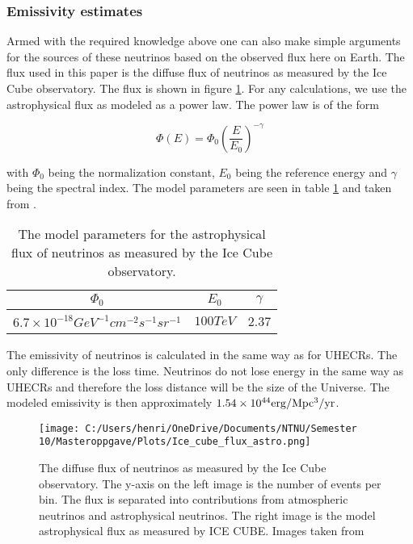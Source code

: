 \subsubsection{Emissivity estimates}
\label{sec:emmisivity_neutrinos}

Armed with the required knowledge above one can also make simple arguments for the sources of these neutrinos based on the observed 
flux here on Earth. The flux used in this paper is the diffuse flux of neutrinos as measured by the Ice Cube observatory. The flux is shown in figure \ref{fig:flux_neutrinos}. 
For any calculations, we use the astrophysical flux as modeled as a power law. The power law is of the form 

\begin{equation}
    \Phi(E) = \Phi_0 \left(\frac{E}{E_0}\right)^{-\gamma}
\end{equation}

with $\Phi_0$ being the normalization constant, $E_0$ being the reference energy and $\gamma$ being the spectral index. The model parameters are seen in table \ref{tab:neutrino_flux} and taken from \cite{Abbasi_2022}.

\begin{table}
    \centering
    \begin{tabular}{|c|c|c|}
        \hline
        $\Phi_0$ & $E_0$ & $\gamma$ \\
        \hline
        $6.7\times 10^{-18} GeV^{-1} cm^{-2} s^{-1} sr^{-1}$ & $100 TeV$ & 2.37 \\
        \hline
    \end{tabular}
    \caption{The model parameters for the astrophysical flux of neutrinos as measured by the Ice Cube observatory.}
    \label{tab:neutrino_flux}
\end{table}

The emissivity of neutrinos is calculated in the same way as for UHECRs. The only difference is the loss time. Neutrinos do not lose energy in the same way as UHECRs and therefore the loss distance will be the size of the Universe. 
The modeled emissivity is then approximately $1.54 \times 10^{44} \rm erg/Mpc^3/yr$. 

\begin{figure}
    \centering
    \texttt{[image: C:/Users/henri/OneDrive/Documents/NTNU/Semester 10/Masteroppgave/Plots/Ice\_cube\_flux\_astro.png]}
    \caption{The diffuse flux of neutrinos as measured by the Ice Cube observatory. The y-axis on the left image is the number of events per bin.  The flux is separated into contributions from atmospheric neutrinos and astrophysical neutrinos. The right image is the model astrophysical flux as measured by ICE CUBE. Images taken from \cite{Abbasi_2022} }
    \label{fig:flux_neutrinos}
\end{figure}